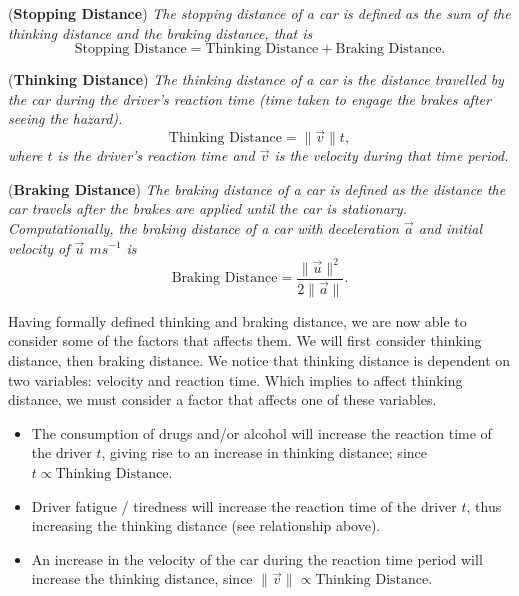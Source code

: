 \begin{definition}{(\textbf{Stopping Distance})}
\textit{The stopping distance of a car is defined as the sum of the thinking distance and the braking distance, that is}
\begin{equation*}
    \text{Stopping Distance} = \text{Thinking Distance} + \text{Braking Distance}.
\end{equation*}
\end{definition}

\begin{definition}{(\textbf{Thinking Distance})}
\textit{The thinking distance of a car is the distance travelled by the car during the driver's reaction time (time taken to engage the brakes after seeing the hazard).}
\begin{equation*}
    \text{Thinking Distance} = \| \vec{v} \|t,
\end{equation*}
\textit{where $t$ is the driver's reaction time and $\vec{v}$ is the velocity during that time period.}
\end{definition}
\begin{definition}{(\textbf{Braking Distance})}
\textit{The braking distance of a car is defined as the distance the car travels after the brakes are applied until the car is stationary. Computationally, the braking distance of a car with deceleration $\vec{a}$ and initial velocity of $\vec{u}$ $ms^{-1}$ is}
\begin{equation*}
    \text{Braking Distance} = \frac{\| \vec{u} \|^2}{2\|\vec{a}\|}.
\end{equation*}
\end{definition}

Having formally defined thinking and braking distance, we are now able to consider some of the factors that affects them. We will first consider thinking distance, then braking distance. We notice that thinking distance is dependent on two variables: velocity and reaction time. Which implies to affect thinking distance, we must consider a factor that affects one of these variables. 
\begin{itemize}
    \item The consumption of drugs and/or alcohol will increase the reaction time of the driver $t$, giving rise to an increase in thinking distance; since $t \propto \text{Thinking Distance}$. 
    \item Driver fatigue / tiredness will increase the reaction time of the driver $t$, thus increasing the thinking distance (see relationship above). 
    \item An increase in the velocity of the car during the reaction time period will increase the thinking distance, since $\| \vec{v} \| \propto \text{Thinking Distance}$.
\end{itemize}

